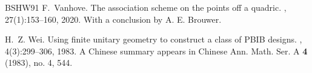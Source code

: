 \documentclass[a4paper]{article}
\theoremstyle{definition}
\begin{document}
\begin{thebibliography}{BSHW91}
F.~Vanhove.
\newblock The association scheme on the points off a quadric.
, 27(1):153--160, 2020.
\newblock With a conclusion by A. E. Brouwer.

H.~Z. Wei.
\newblock Using finite unitary geometry to construct a class of {PBIB} designs.
, 4(3):299--306, 1983.
\newblock A Chinese summary appears in Chinese Ann. Math. Ser. A {{\bf{4}}}
  (1983), no. 4, 544.

\end{thebibliography}
\end{document}
